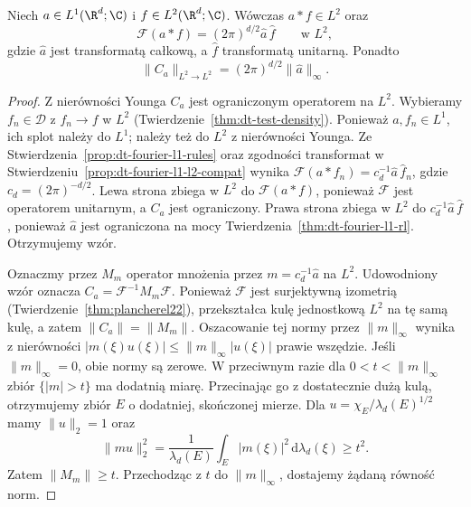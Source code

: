 \begin{twierdzenie}
\label{thm:dt-convolution-fourier-l1-l2}
Niech $a\in L^1(\R^d;\C)$ i $f\in L^2(\R^d;\C)$.
Wówczas $a*f\in L^2$ oraz
\[
 \mathcal F(a*f)=(2\pi)^{d/2}\widehat a\,\widehat f
 \qquad\text{w }L^2,
\]
gdzie $\widehat a$ jest transformatą całkową, a
$\widehat f$ transformatą unitarną. Ponadto
\[
 \|C_a\|_{L^2\to L^2}=(2\pi)^{d/2}\|\widehat a\|_\infty.
\]
\end{twierdzenie}
\begin{proof}
Z nierówności Younga $C_a$ jest ograniczonym operatorem
na $L^2$. Wybieramy $f_n\in\mathcal D$ z $f_n\to f$
w $L^2$ (Twierdzenie~\ref{thm:dt-test-density}).
Ponieważ $a,f_n\in L^1$, ich splot należy do $L^1$;
należy też do $L^2$ z nierówności Younga. Ze
Stwierdzenia~\ref{prop:dt-fourier-l1-rules}
oraz zgodności transformat w
Stwierdzeniu~\ref{prop:dt-fourier-l1-l2-compat}
wynika
$\mathcal F(a*f_n)=c_d^{-1}\widehat a\,\widehat f_n$,
gdzie $c_d=(2\pi)^{-d/2}$.
Lewa strona zbiega w $L^2$ do $\mathcal F(a*f)$,
ponieważ $\mathcal F$ jest operatorem unitarnym,
a $C_a$ jest ograniczony.
Prawa strona zbiega w $L^2$ do
$c_d^{-1}\widehat a\,\widehat f$, ponieważ
$\widehat a$ jest ograniczona na mocy
Twierdzenia~\ref{thm:dt-fourier-l1-rl}. Otrzymujemy wzór.

Oznaczmy przez $M_m$ operator mnożenia przez
$m=c_d^{-1}\widehat a$ na $L^2$. Udowodniony wzór
oznacza $C_a=\mathcal F^{-1}M_m\mathcal F$.
Ponieważ $\mathcal F$ jest surjektywną izometrią
(Twierdzenie~\ref{thm:plancherel22}), przekształca
kulę jednostkową $L^2$ na tę samą kulę, a zatem
$\|C_a\|=\|M_m\|$.
Oszacowanie tej normy przez $\|m\|_\infty$ wynika
z nierówności $|m(\xi)u(\xi)|\le\|m\|_\infty|u(\xi)|$
prawie wszędzie.
Jeśli $\|m\|_\infty=0$, obie normy są zerowe.
W przeciwnym razie dla $0<t<\|m\|_\infty$ zbiór
$\{|m|>t\}$ ma dodatnią miarę. Przecinając go z
dostatecznie dużą kulą, otrzymujemy zbiór $E$
o dodatniej, skończonej mierze. Dla
$u=\chi_E/\lambda_d(E)^{1/2}$ mamy $\|u\|_2=1$
oraz
\[
 \|mu\|_2^2=\frac{1}{\lambda_d(E)}
 \int_E|m(\xi)|^2\,\mathrm d\lambda_d(\xi)\ge t^2.
\]
Zatem $\|M_m\|\ge t$. Przechodząc z $t$ do
$\|m\|_\infty$, dostajemy żądaną równość norm.
\end{proof}

